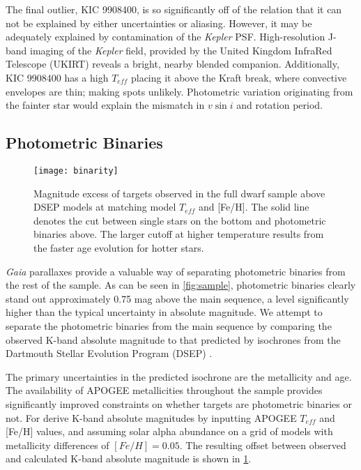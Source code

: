 \documentclass[manuscript]{aastex6}
\newcommand{\vsini}{\ensuremath{v \sin i}}
\newcommand{\Kepler}{\mbox{\textit{Kepler}}}
\newcommand{\Gaia}{\mbox{\textit{Gaia}}}
\newcommand{\Teff}{\ensuremath{T_{eff}}}
\begin{document}
The final outlier, KIC 9908400, is so significantly off of the relation
that it can not be explained by either uncertainties or aliasing. However,
it may be adequately explained by contamination of the \Kepler{} PSF\@. 
High-resolution J-band imaging of the \Kepler{} field, provided by the United
Kingdom InfraRed Telescope (UKIRT) reveals a bright, nearby blended companion.
Additionally, KIC 9908400 has a high \Teff{} placing it above the Kraft
break, where convective envelopes are thin;
making spots unlikely. Photometric variation originating from the fainter 
star would explain the mismatch in \vsini{} and rotation period.

\subsection{Photometric Binaries}
\label{sec:binarity}

\begin{figure}[htb]
    \centering
    \texttt{[image: binarity]}
    \caption{Magnitude excess of targets observed in the full dwarf sample
    above DSEP models at matching model \Teff{} and [Fe/H]. The solid line
denotes the cut between single stars on the bottom and photometric binaries
above. The larger cutoff at higher temperature results from the faster age
evolution for hotter stars.}
    \label{fig:binarity}
\end{figure}

\Gaia{} parallaxes provide a valuable way of separating photometric binaries
from the rest of the sample. As can be seen in \cref{fig:sample}, photometric
binaries clearly stand out approximately 0.75 mag above the main sequence, a
level significantly higher than the typical uncertainty in absolute magnitude. 
We attempt to separate the photometric binaries from the main sequence by
comparing the observed K-band absolute magnitude to that predicted by 
isochrones from the Dartmouth Stellar Evolution Program (DSEP) 
\citep{Dotter07,Dotter08}.

The primary uncertainties in the predicted isochrone are the metallicity and
age. The availability of APOGEE metallicities throughout the sample provides
significantly improved constraints on whether targets are photometric binaries
or not. For derive K-band absolute magnitudes by inputting APOGEE
\Teff{} and [Fe/H] values, and assuming solar alpha abundance on a grid of
models with metallicity differences of \([Fe/H] = 0.05\). The resulting offset
between observed and calculated K-band absolute magnitude is shown in 
\cref{fig:binarity}. 
\end{document}
